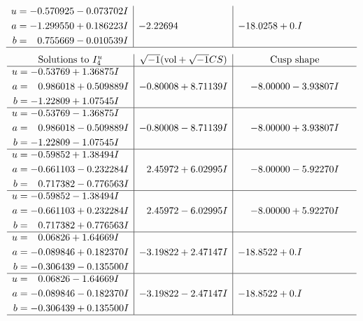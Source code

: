 \documentclass[1p]{elsarticle_modified}
\theoremstyle{definition}
\newcommand{\I}{\sqrt{-1}}
\begin{document}
$$\begin{array}{c|c|c}
\begin{aligned}
u &= -0.570925 - 0.073702 I \\
a &= -1.299550 + 0.186223 I \\
b &= \phantom{-}0.755669 - 0.010539 I\end{aligned}
 & -2.22694\phantom{ +0.000000I} & -18.0258 + 0. I\phantom{ +0.000000I}\\
 \hline 
 \end{array}$$\newpage$$\begin{array}{c|c|c}  
\text{Solutions to }I^u_{4}& \I (\text{vol} + \sqrt{-1}CS) & \text{Cusp shape}\\
 \hline 
\begin{aligned}
u &= -0.53769 + 1.36875 I \\
a &= \phantom{-}0.986018 + 0.509889 I \\
b &= -1.22809 + 1.07545 I\end{aligned}
 & -0.80008 + 8.71139 I & -8.00000 - 3.93807 I \\ \hline\begin{aligned}
u &= -0.53769 - 1.36875 I \\
a &= \phantom{-}0.986018 - 0.509889 I \\
b &= -1.22809 - 1.07545 I\end{aligned}
 & -0.80008 - 8.71139 I & -8.00000 + 3.93807 I \\ \hline\begin{aligned}
u &= -0.59852 + 1.38494 I \\
a &= -0.661103 - 0.232284 I \\
b &= \phantom{-}0.717382 - 0.776563 I\end{aligned}
 & \phantom{-}2.45972 + 6.02995 I & -8.00000 - 5.92270 I \\ \hline\begin{aligned}
u &= -0.59852 - 1.38494 I \\
a &= -0.661103 + 0.232284 I \\
b &= \phantom{-}0.717382 + 0.776563 I\end{aligned}
 & \phantom{-}2.45972 - 6.02995 I & -8.00000 + 5.92270 I \\ \hline\begin{aligned}
u &= \phantom{-}0.06826 + 1.64669 I \\
a &= -0.089846 + 0.182370 I \\
b &= -0.306439 - 0.135500 I\end{aligned}
 & -3.19822 + 2.47147 I & -18.8522 + 0. I\phantom{ +0.000000I} \\ \hline\begin{aligned}
u &= \phantom{-}0.06826 - 1.64669 I \\
a &= -0.089846 - 0.182370 I \\
b &= -0.306439 + 0.135500 I\end{aligned}
 & -3.19822 - 2.47147 I & -18.8522 + 0. I\phantom{ +0.000000I}\\
 \hline 
 \end{array}$$\newpage\newpage\renewcommand{\arraystretch}{1}
\end{document}
